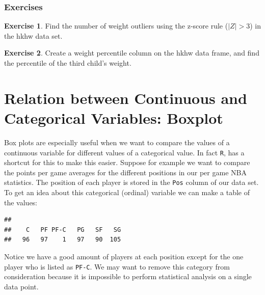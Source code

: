 \documentclass[
]{book}
\newenvironment{Shaded}{\begin{snugshade}}{\end{snugshade}}
\newcommand{\FunctionTok}[1]{\textcolor[rgb]{0.00,0.00,0.00}{#1}}
\newcommand{\NormalTok}[1]{#1}
\newcommand{\SpecialCharTok}[1]{\textcolor[rgb]{0.00,0.00,0.00}{#1}}
\theoremstyle{definition}
\theoremstyle{definition}
\theoremstyle{definition}
\newtheorem{exercise}{Exercise}[chapter]
\theoremstyle{definition}
\theoremstyle{remark}
\begin{document}
\hypertarget{exercises-1}{%
\subsubsection{Exercises}\label{exercises-1}}

\begin{exercise}
\protect\hypertarget{exr:unnamed-chunk-111}{}\label{exr:unnamed-chunk-111}Find the number of weight outliers using the z-score rule (\(|Z|>3\)) in the hkhw data set.
\end{exercise}

\begin{exercise}
\protect\hypertarget{exr:unnamed-chunk-112}{}\label{exr:unnamed-chunk-112}Create a weight percentile column on the hkhw data frame, and find the percentile of the third child's weight.
\end{exercise}

\hypertarget{relation-between-continuous-and-categorical-variables-boxplot}{%
\section{Relation between Continuous and Categorical Variables: Boxplot}\label{relation-between-continuous-and-categorical-variables-boxplot}}

Box plots are especially useful when we want to compare the values of a continuous variable for different values of a categorical value. In fact \texttt{R}, has a shortcut for this to make this easier. Suppose for example we want to compare the points per game averages for the different positions in our per game NBA statistics. The position of each player is stored in the \texttt{Pos} column of our data set. To get an idea about this categorical (ordinal) variable we can make a table of the values:

\begin{Shaded}
\end{Shaded}

\begin{verbatim}
## 
##    C   PF PF-C   PG   SF   SG 
##   96   97    1   97   90  105
\end{verbatim}

Notice we have a good amount of players at each position except for the one player who is listed as \texttt{PF-C}. We may want to remove this category from consideration because it is impossible to perform statistical analysis on a single data point.
\end{document}

